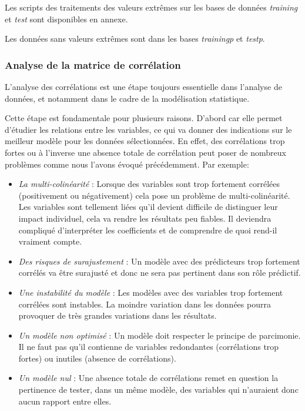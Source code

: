 \documentclass[
  french,
  11pt,
  a4paper,
]{article}
\providecommand{\tightlist}{%
  \setlength{\itemsep}{0pt}\setlength{\parskip}{0pt}}
\begin{document}
Les scripts des traitements des valeurs extrêmes sur les bases de
données \emph{training} et \emph{test} sont disponibles en annexe.

Les données sans valeurs extrêmes sont dans les bases \emph{trainingp}
et \emph{testp}.

\subsubsection{Analyse de la matrice de
corrélation}\label{analyse-de-la-matrice-de-corruxe9lation}

L'analyse des corrélations est une étape toujours essentielle dans
l'analyse de données, et notamment dans le cadre de la modélisation
statistique.

Cette étape est fondamentale pour plusieurs raisons. D'abord car elle
permet d'étudier les relations entre les variables, ce qui va donner des
indications sur le meilleur modèle pour les données sélectionnées. En
effet, des corrélations trop fortes ou à l'inverse une absence totale de
corrélation peut poser de nombreux problèmes comme nous l'avons évoqué
précédemment. Par exemple:

\begin{itemize}
\tightlist
\item
  \emph{La multi-colinéarité} : Lorsque des variables sont trop
  fortement corrélées (positivement ou négativement) cela pose un
  problème de multi-colinéarité. Les variables sont tellement liées
  qu'il devient difficile de distinguer leur impact individuel, cela va
  rendre les résultats peu fiables. Il deviendra compliqué d'interpréter
  les coefficients et de comprendre de quoi rend-il vraiment compte.
\item
  \emph{Des risques de surajustement} : Un modèle avec des prédicteurs
  trop fortement corrélés va être surajusté et donc ne sera pas
  pertinent dans son rôle prédictif.
\item
  \emph{Une instabilité du modèle} : Les modèles avec des variables trop
  fortement corrélées sont instables. La moindre variation dans les
  données pourra provoquer de très grandes variations dans les
  résultats.
\item
  \emph{Un modèle non optimisé} : Un modèle doit respecter le principe
  de parcimonie. Il ne faut pas qu'il contienne de variables redondantes
  (corrélations trop fortes) ou inutiles (absence de corrélations).
\item
  \emph{Un modèle nul} : Une absence totale de corrélations remet en
  question la pertinence de tester, dans un même modèle, des variables
  qui n'auraient donc aucun rapport entre elles.
\end{itemize}
\end{document}
